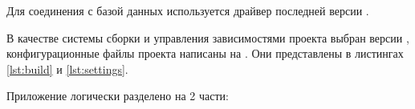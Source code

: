 \begin{itemize}
Для соединения с базой данных используется  драйвер последней версии .

В качестве системы сборки и управления зависимостями проекта выбран  версии , конфигурационные файлы проекта написаны на . Они представлены в листингах \ref{lst:build} и \ref{lst:settings}.




	
\end{itemize}

Приложение логически разделено на 2 части:

